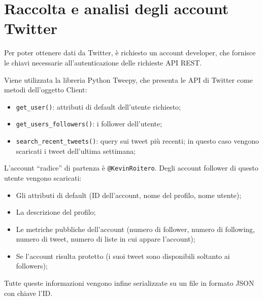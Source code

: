 \documentclass[a4paper, 11pt, twoside]{article}
\begin{document}
\section{Raccolta e analisi degli account Twitter}
Per poter ottenere dati da Twitter, è richiesto un account developer, che fornisce le chiavi necessarie all'autenticazione delle richieste API REST.

Viene utilizzata la libreria Python Tweepy, che presenta le API di Twitter come metodi dell'oggetto Client:
\begin{itemize}
    \item \texttt{get\_user()}: attributi di default dell'utente richiesto;
    \item \texttt{get\_users\_followers()}: i follower dell'utente;
    \item \texttt{search\_recent\_tweets()}: query sui tweet più recenti; in questo caso vengono scaricati i tweet dell'ultima settimana;
\end{itemize}

L'account ``radice'' di partenza è \texttt{@KevinRoitero}. Degli account follower di questo utente vengono scaricati:
\begin{itemize}
    \item Gli attributi di default (ID dell'account, nome del profilo, nome utente);
    \item La descrizione del profilo;
    \item Le metriche pubbliche dell'account (numero di follower, numero di following, numero di tweet, numero di liste in cui appare l'account);
    \item Se l'account risulta protetto (i suoi tweet sono disponibili soltanto ai followers);
\end{itemize}

Tutte queste informazioni vengono infine serializzate su un file in formato JSON con chiave l'ID.
\end{document}

